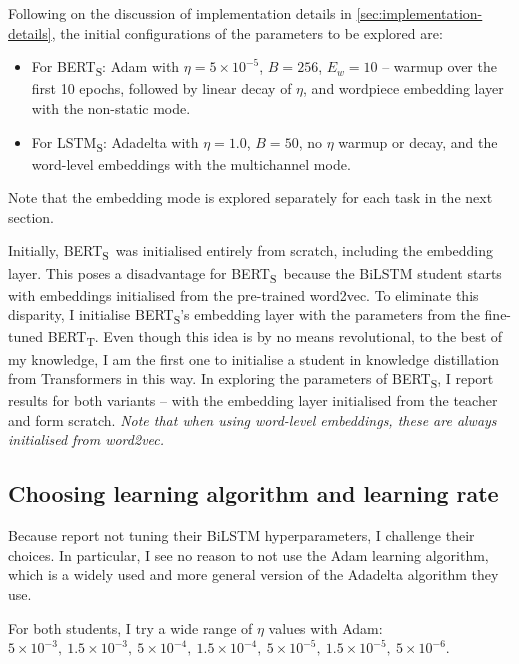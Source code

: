 \documentclass[bsc,frontabs,twoside,singlespacing,parskip,deptreport]{infthesis}
\def\BERTT{BERT\textsubscript{T}}
\def\BERTS{BERT\textsubscript{S}}
\def\LSTMS{LSTM\textsubscript{S}}
\begin{document}
{{      %

    Following on the discussion of implementation details in \autoref{sec:implementation-details}, the initial configurations of the parameters to be explored are:
    \begin{itemize}
      \item For \BERTS: Adam with $\eta=5\times10^{-5}$, $B=256$, $E_{w}=10$ -- warmup over the first 10 epochs, followed by linear decay of $\eta$, and wordpiece embedding layer with the non-static mode.
      \item For \LSTMS: Adadelta with $\eta=1.0$, $B=50$, no $\eta$ warmup or decay, and the word-level embeddings with the multichannel mode.
    \end{itemize}
    Note that the embedding mode is explored separately for each task in the next section.

    Initially, \BERTS~was initialised entirely from scratch, including the embedding layer. 
    This poses a disadvantage for \BERTS~because the BiLSTM student starts with embeddings initialised from the pre-trained word2vec. To eliminate this disparity, I initialise \BERTS's embedding layer with the parameters from the fine-tuned \BERTT. Even though this idea is by no means revolutional, to the best of my knowledge, I am the first one to initialise a student in knowledge distillation from Transformers in this way.
    In exploring the parameters of \BERTS, I report results for both variants -- with the embedding layer initialised from the teacher and form scratch. \textit{Note that when using word-level embeddings, these are always initialised from word2vec.}
    
    \subsection{Choosing learning algorithm and learning rate}{
      Because \citet{Tang_2019b} report not tuning their BiLSTM hyperparameters, I challenge their choices.
      In particular, I see no reason to not use the Adam learning algorithm, which is a widely used and more general version of the Adadelta algorithm they use.

      For both students, I try a wide range of $\eta$ values with Adam: $5\times10^{-3},\ 1.5\times10^{-3},\ 5\times10^{-4},\ 1.5\times10^{-4},\ 5\times10^{-5},\ 1.5\times10^{-5},\ 5\times10^{-6}$.
      
}}}
\end{document}
